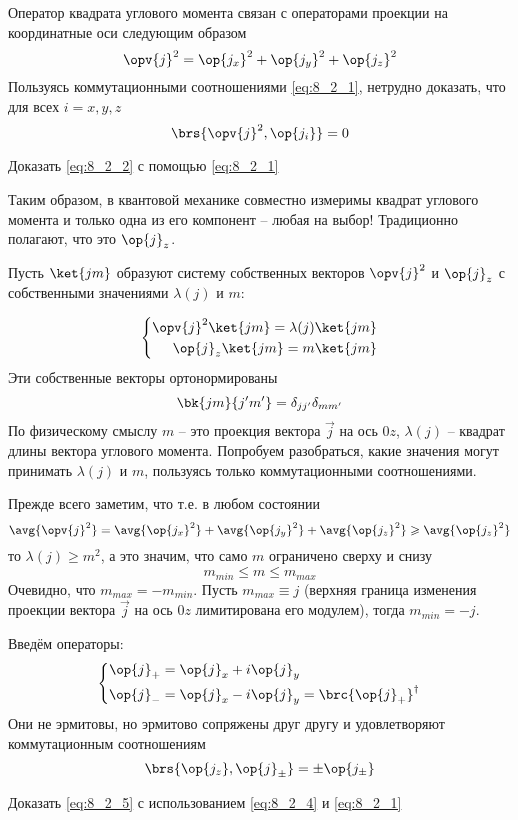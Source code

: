 Оператор квадрата углового момента связан с операторами проекции на координатные оси следующим образом
$$
\opv{j}^2 = \op{j_x}^2 + \op{j_y}^2 + \op{j_z}^2
$$%
%
Пользуясь  коммутационными соотношениями \eqref{eq:8_2_1}, нетрудно доказать, что для всех $i=x, y, z$
\begin{equation}
\label{eq:8_2_2}
\brs{\opv{j}^2, \op{j_i}} = 0
\end{equation}

\begin{excr}
Доказать \eqref{eq:8_2_2} с помощью \eqref{eq:8_2_1}
\end{excr}

Таким образом, в квантовой механике совместно измеримы квадрат углового момента и только одна из его компонент -- любая на выбор! Традиционно полагают, что это $\op{j}_z$.

Пусть $\ket{jm}$ образуют систему собственных векторов $\opv{j}^2$ и  $\op{j}_z$ с собственными значениями $\lambda(j)$ и $m$:

\begin{equation}
\label{eq:8_2_3}
\left\{
\begin{aligned}
\opv{j}^2 \ket{jm} = \lambda(j) \ket{jm} \\
\op{j}_z \ket{jm} = m \ket{jm}
\end{aligned}
\right.
\end{equation}%
%
Эти собственные векторы ортонормированы
$$
\bk{jm}{j'm'} = \delta_{jj'} \delta_{mm'}
$$%
%
По физическому смыслу $m$ -- это проекция вектора $\vec{j}$ на ось $0z$, $\lambda(j)$ -- квадрат длины вектора углового момента. Попробуем разобраться, какие значения могут принимать $\lambda(j)$ и $m$, пользуясь только коммутационными соотношениями.

Прежде всего заметим, что т.е. в любом состоянии
$$
\avg{\opv{j}^2} = \avg{\op{j_x}^2} + \avg{\op{j_y}^2} + \avg{\op{j_z}^2} \geqslant \avg{\op{j_z}^2}
$$%
%
то $\lambda(j) \geqslant m^2$, а это значим, что само $m$ ограничено сверху и снизу
$$
m_{min} \leqslant m \leqslant m_{max}
$$%
%
Очевидно, что $m_{max} = - m_{min}$. Пусть $m_{max} \equiv j$ (верхняя граница изменения проекции вектора $\vec{j}$ на ось $0z$ лимитирована его модулем), тогда $m_{min} = -j$.

Введём операторы:
\begin{equation}
\label{eq:8_2_4}
\left\{
\begin{aligned}
\op{j}_{+} &= \op{j}_{x} + i \op{j}_{y} \\
\op{j}_{-} &= \op{j}_{x} - i \op{j}_{y} = \brc{\op{j}_{+}}^\dag
\end{aligned}
\right.
\end{equation}%
%
Они не эрмитовы, но эрмитово сопряжены друг другу и удовлетворяют коммутационным соотношениям
\begin{equation}
\label{eq:8_2_5}
\brs{\op{j_z}, \op{j}_{\pm}} = \pm \op{j_{\pm}}
\end{equation}%
%
\begin{excr}
Доказать \eqref{eq:8_2_5} с использованием \eqref{eq:8_2_4} и \eqref{eq:8_2_1}
\end{excr}

